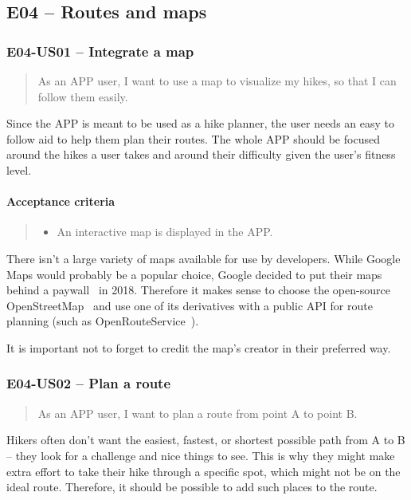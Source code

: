 \subsection*{E04 -- Routes and maps}

\subsubsection*{E04-US01 -- Integrate a map}
\begin{quote}
As an APP user, I want to use a map to visualize my hikes, so that I can follow them easily.
\end{quote}

Since the APP is meant to be used as a hike planner, the user needs an easy to follow aid to help them plan their routes.
The whole APP should be focused around the hikes a user takes and around their difficulty given the user's fitness level.

\paragraph*{Acceptance criteria}
\begin{quote}
\begin{itemize}
    \item An interactive map is displayed in the APP.
\end{itemize}
\end{quote}

There isn't a large variety of maps available for use by developers.
While Google Maps would probably be a popular choice, Google decided to put their maps behind a paywall~\cite{google-maps-paywall} in 2018.
Therefore it makes sense to choose the open-source OpenStreetMap~\cite{OpenStreetMap} and use one of its derivatives with a public API for route planning (such as OpenRouteService~\cite{OpenRouteService}).

It is important not to forget to credit the map's creator in their preferred way.

\subsubsection*{E04-US02 -- Plan a route}
\begin{quote}
As an APP user, I want to plan a route from point A to point B.
\end{quote}

Hikers often don't want the easiest, fastest, or shortest possible path from A to B -- they look for a challenge and nice things to see.
This is why they might make extra effort to take their hike through a specific spot, which might not be on the ideal route.
Therefore, it should be possible to add such places to the route.

